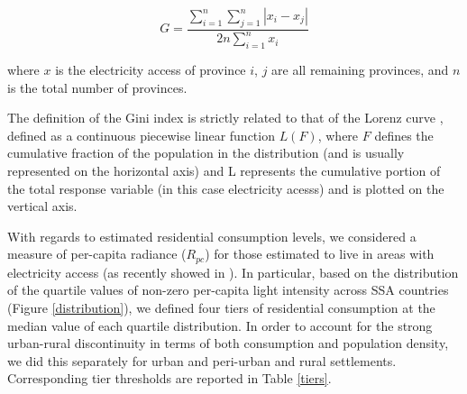 \documentclass[preprint,12pt]{elsarticle}
\begin{document}
\begin{equation}
  G  = \frac { \sum _ { i = 1 } ^ { n } \sum _ { j = 1 } ^ { n } \left| x _ { i } - x _ { j } \right| } { 2 n \sum _ { i = 1 } ^ { n } x _ { i } }
\end{equation}

where $x$ is the electricity access of province $i$, $j$ are all remaining provinces, and $n$ is the total number of provinces. 

The definition of the Gini index is strictly related to that of the Lorenz curve \citep{lorenz1905methods}, defined as a continuous piecewise linear function $L(F)$, where $F$ defines the cumulative fraction of the population in the distribution (and is usually represented on the horizontal axis) and L represents the cumulative portion of the total response variable (in this case electricity acesss) and is plotted on the vertical axis.

With regards to estimated residential consumption levels, we considered a measure of per-capita radiance ($R_{pc}$) for those estimated to live in areas with electricity access (as recently showed in \citep{xiao2018spatio}). In particular, based on the distribution of the quartile values of non-zero per-capita light intensity across SSA countries (Figure \ref{distribution}), we defined four tiers of residential consumption at the median value of each quartile distribution. In order to account for the strong urban-rural discontinuity in terms of both consumption and population density, we did this separately for urban and peri-urban and rural settlements. Corresponding tier thresholds are reported in Table \ref{tiers}. 
\end{document}
